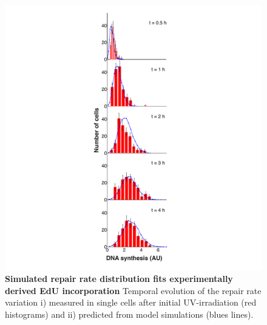 \begin{figure}[htbp]
	\begin{center}
		\includegraphics[width=1\textwidth]{Abbildungen/figure3_7.pdf}
		\caption{\textbf{Simulated repair rate distribution fits experimentally derived EdU incorporation} Temporal evolution of the repair rate variation i)  measured in single cells after initial UV-irradiation (red histograms) and ii) predicted from model simulations (blues lines).}
		\label{fig:ModelData_tempVar}
	\end{center}
\end{figure}